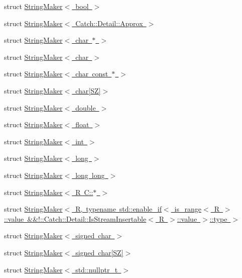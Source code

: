 \begin{DoxyCompactItemize}
struct \mbox{\hyperlink{struct_catch_1_1_string_maker_3_01bool_01_4}{String\+Maker$<$ bool $>$}}
\item 
struct \mbox{\hyperlink{struct_catch_1_1_string_maker_3_01_catch_1_1_detail_1_1_approx_01_4}{String\+Maker$<$ Catch\+::\+Detail\+::\+Approx $>$}}
\item 
struct \mbox{\hyperlink{struct_catch_1_1_string_maker_3_01char_01_5_01_4}{String\+Maker$<$ char $\ast$ $>$}}
\item 
struct \mbox{\hyperlink{struct_catch_1_1_string_maker_3_01char_01_4}{String\+Maker$<$ char $>$}}
\item 
struct \mbox{\hyperlink{struct_catch_1_1_string_maker_3_01char_01const_01_5_01_4}{String\+Maker$<$ char const $\ast$ $>$}}
\item 
struct \mbox{\hyperlink{struct_catch_1_1_string_maker_3_01char[_s_z]_4}{String\+Maker$<$ char\mbox{[}\+S\+Z\mbox{]}$>$}}
\item 
struct \mbox{\hyperlink{struct_catch_1_1_string_maker_3_01double_01_4}{String\+Maker$<$ double $>$}}
\item 
struct \mbox{\hyperlink{struct_catch_1_1_string_maker_3_01float_01_4}{String\+Maker$<$ float $>$}}
\item 
struct \mbox{\hyperlink{struct_catch_1_1_string_maker_3_01int_01_4}{String\+Maker$<$ int $>$}}
\item 
struct \mbox{\hyperlink{struct_catch_1_1_string_maker_3_01long_01_4}{String\+Maker$<$ long $>$}}
\item 
struct \mbox{\hyperlink{struct_catch_1_1_string_maker_3_01long_01long_01_4}{String\+Maker$<$ long long $>$}}
\item 
struct \mbox{\hyperlink{struct_catch_1_1_string_maker_3_01_r_01_c_1_1_5_01_4}{String\+Maker$<$ R C\+::$\ast$ $>$}}
\item 
struct \mbox{\hyperlink{struct_catch_1_1_string_maker_3_01_r_00_01typename_01std_1_1enable__if_3_01is__range_3_01_r_01_4536d8fedfff6d62432b3dc59b56e1380}{String\+Maker$<$ R, typename std\+::enable\+\_\+if$<$ is\+\_\+range$<$ R $>$\+::value \&\&!\+::\+Catch\+::\+Detail\+::\+Is\+Stream\+Insertable$<$ R $>$\+::value $>$\+::type $>$}}
\item 
struct \mbox{\hyperlink{struct_catch_1_1_string_maker_3_01signed_01char_01_4}{String\+Maker$<$ signed char $>$}}
\item 
struct \mbox{\hyperlink{struct_catch_1_1_string_maker_3_01signed_01char[_s_z]_4}{String\+Maker$<$ signed char\mbox{[}\+S\+Z\mbox{]}$>$}}
\item 
struct \mbox{\hyperlink{struct_catch_1_1_string_maker_3_01std_1_1nullptr__t_01_4}{String\+Maker$<$ std\+::nullptr\+\_\+t $>$}}

\end{DoxyCompactItemize}
